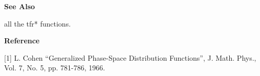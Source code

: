 {\bf \large \sf See Also}\\
\hspace*{1.5cm}
\begin{minipage}[t]{13.5cm}
all the {\ty tfr*} functions.
\end{minipage}
\vspace*{.5cm}


{\bf \large \sf Reference}\\
\hspace*{1.5cm}
\begin{minipage}[t]{13.5cm}
[1] L. Cohen ``Generalized Phase-Space Distribution Functions'',
J. Math. Phys., Vol. 7, No. 5, pp. 781-786, 1966.
\end{minipage}
